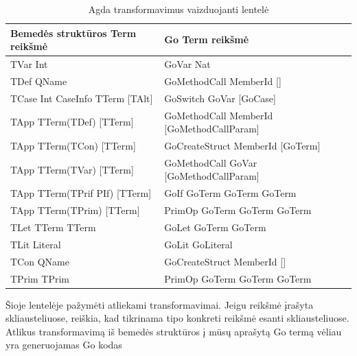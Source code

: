 \documentclass{VUMIFPSbakalaurinis}
\begin{document}
\begin{center}
	\begin{table}[h]
		\caption{Agda transformavimus vaizduojanti lentelė}
	\begin{tabular}{ |l|l| } 
	\hline
	\textbf{Bemedės struktūros Term reikšmė} & \textbf{Go Term reikšmė}  \\
	\hline
	TVar Int & GoVar Nat \\ 
	\hline
	TDef QName & GoMethodCall MemberId [] \\ 
	\hline
	TCase Int CaseInfo TTerm [TAlt] & GoSwitch GoVar [GoCase] \\ 
	\hline
	TApp TTerm(TDef) [TTerm] & GoMethodCall MemberId [GoMethodCallParam] \\ 
	\hline
	TApp TTerm(TCon) [TTerm] & GoCreateStruct MemberId [GoTerm] \\ 
	\hline
	TApp TTerm(TVar) [TTerm] & GoMethodCall GoVar [GoMethodCallParam] \\ 
	\hline
	TApp TTerm(TPrif PIf) [TTerm] & GoIf GoTerm GoTerm GoTerm \\ 
	\hline
	TApp TTerm(TPrim) [TTerm] & PrimOp GoTerm GoTerm GoTerm \\ 
	\hline
	TLet TTerm TTerm & GoLet GoTerm GoTerm \\ 
	\hline
	TLit Literal & GoLit GoLiteral \\ 
	\hline
	TCon QName & GoCreateStruct MemberId [] \\ 
	\hline
	TPrim TPrim & PrimOp GoTerm GoTerm GoTerm \\ 
	\hline
	\end{tabular}
	\label{fig:goterm}
\end{table}
	\end{center}
	Šioje lentelėje pažymėti atliekami transformavimai. Jeigu reikšmė įrašyta skliausteliuose, reiškia, kad tikrinama tipo konkreti reikšmė esanti skliausteliuose. Atlikus transformavimą iš bemedės struktūros į mūsų aprašytą Go termą vėliau yra generuojamas Go kodas
\end{document}
